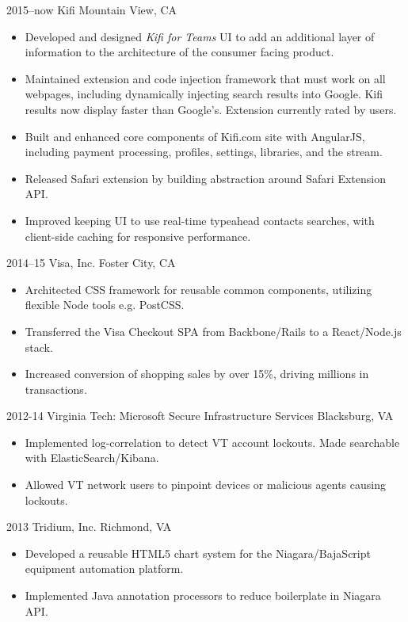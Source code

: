 \documentclass[]{cv-style}          %
\begin{document}
\begin{entrylist}
\entry
  {2015--now}
  {Kifi}
  {Mountain View, CA}
  {
  \begin{itemize}
  	\item Developed and designed \textit{Kifi for Teams} UI to add an additional layer of information to the architecture of the consumer facing product.
  	\item Maintained extension and code injection framework that must work on all webpages, including dynamically injecting search results into Google. Kifi results now display faster than Google's. Extension currently rated by users.
    \item Built and enhanced core components of Kifi.com site with AngularJS, including payment processing, profiles, settings, libraries, and the stream.
    \item Released Safari extension by building abstraction around Safari Extension API.
    \item Improved keeping UI to use real-time typeahead contacts searches, with client-side caching for responsive performance.
  \end{itemize}}
\entry
  {2014--15}
  {Visa, Inc.}
  {Foster City, CA}
  {
  \begin{itemize}
    \item Architected CSS framework for reusable common components, utilizing flexible Node tools e.g. PostCSS.
    \item Transferred the Visa Checkout SPA from Backbone/Rails to a React/Node.js stack.
    \item Increased conversion of shopping sales by over 15\%, driving millions in transactions.
  \end{itemize}}
\entry
  {2012-14}
  {Virginia Tech: Microsoft Secure Infrastructure Services}
  {Blacksburg, VA}
  {
  \begin{itemize}
    \item Implemented log-correlation to detect VT account lockouts. Made searchable with ElasticSearch/Kibana.
    \item Allowed VT network users to pinpoint devices or malicious agents causing lockouts.
  \end{itemize}}
\entry
  {2013}
  {Tridium, Inc.}
  {Richmond, VA}
  {
  \begin{itemize}
    \item Developed a reusable HTML5 chart system for the Niagara/BajaScript equipment automation platform.
    \item Implemented Java annotation processors to reduce boilerplate in Niagara API.
  \end{itemize}}

\end{entrylist}
\end{document}
